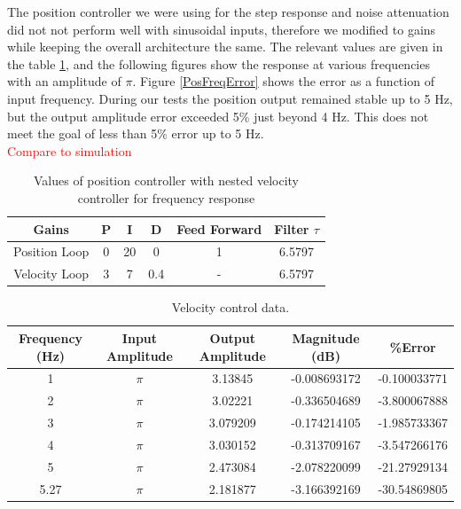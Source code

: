 \documentclass{article}
\newcommand{\xxx}[1]{\textcolor{red}{#1}}
\theoremstyle{plain}
\theoremstyle{definition}
\theoremstyle{remark}
\begin{document}
The position controller we were using for the step response and noise attenuation did not not perform well with sinusoidal inputs, therefore we modified to gains while keeping the overall architecture the same. The relevant values are given in the table \ref{positionFreqGains}, and the following figures show the response at various frequencies with an amplitude of $\pi$. Figure \ref{PosFreqError} shows the error as a function of input frequency. During our tests the position output remained stable up to 5 Hz, but the output amplitude error exceeded 5\% just beyond 4 Hz. This does not meet the goal of less than 5\% error up to 5 Hz.\\

\xxx{Compare to simulation}

\begin{table}[htb]
\begin{center}
    \begin{tabular}{|c|c|c|c|c|c|}
        \hline
        Gains & P   & I & D   & Feed Forward   & Filter $\tau$   \\ \hline
        Position Loop            & 0 & 20  & 0 & 1 & 6.5797    \\ 
        Velocity Loop       & 3   & 7    & 0.4   & -  & 6.5797  \\ 
       \hline
    \end{tabular}
\end{center}
\caption{Values of position controller with nested velocity controller for frequency response}
\label{positionFreqGains}
\end{table}

\begin{table}[htb]
    \begin{tabular}{|c|c|c|c|c|}
        \hline
        Frequency (Hz) & Input Amplitude & Output Amplitude & Magnitude (dB) & \%Error       \\ \hline
        1              & $\pi$           & 3.13845          & -0.008693172   & -0.100033771 \\ 
        2              & $\pi$           & 3.02221          & -0.336504689   & -3.800067888 \\ 
        3              & $\pi$           & 3.079209         & -0.174214105   & -1.985733367 \\ 
        4              & $\pi$           & 3.030152         & -0.313709167   & -3.547266176 \\ 
        5              & $\pi$           & 2.473084         & -2.078220099   & -21.27929134 \\ 
        5.27           & $\pi$           & 2.181877         & -3.166392169   & -30.54869805 \\
        \hline
    \end{tabular}
    \caption{Velocity control data.}
    \label{q4_atable}
\end{table}
\end{document}
